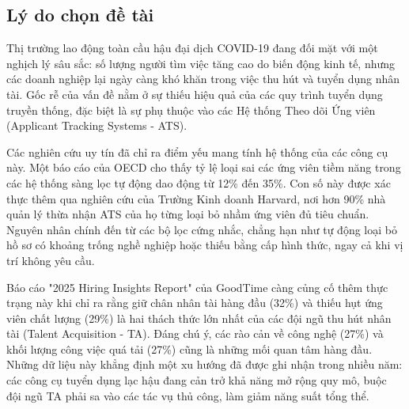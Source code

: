 \documentclass{article}
\begin{document}
\setcounter{subsection}{0}
\setcounter{table}{0}
\setcounter{figure}{0}
\subsection{Lý do chọn đề tài}

Thị trường lao động toàn cầu hậu đại dịch COVID-19 đang đối mặt với một nghịch lý sâu sắc: số lượng người tìm việc tăng cao do biến động kinh tế, nhưng các doanh nghiệp lại ngày càng khó khăn trong việc thu hút và tuyển dụng nhân tài. Gốc rễ của vấn đề nằm ở sự thiếu hiệu quả của các quy trình tuyển dụng truyền thống, đặc biệt là sự phụ thuộc vào các Hệ thống Theo dõi Ứng viên (Applicant Tracking Systems - ATS).

Các nghiên cứu uy tín đã chỉ ra điểm yếu mang tính hệ thống của các công cụ này. Một báo cáo của OECD cho thấy tỷ lệ loại sai các ứng viên tiềm năng trong các hệ thống sàng lọc tự động dao động từ 12\% đến 35\%. Con số này được xác thực thêm qua nghiên cứu của Trường Kinh doanh Harvard, nơi hơn 90\% nhà quản lý thừa nhận ATS của họ từng loại bỏ nhầm ứng viên đủ tiêu chuẩn. Nguyên nhân chính đến từ các bộ lọc cứng nhắc, chẳng hạn như tự động loại bỏ hồ sơ có khoảng trống nghề nghiệp hoặc thiếu bằng cấp hình thức, ngay cả khi vị trí không yêu cầu.

Báo cáo "2025 Hiring Insights Report" của GoodTime càng củng cố thêm thực trạng này khi chỉ ra rằng giữ chân nhân tài hàng đầu (32\%) và thiếu hụt ứng viên chất lượng (29\%) là hai thách thức lớn nhất của các đội ngũ thu hút nhân tài (Talent Acquisition - TA). Đáng chú ý, các rào cản về công nghệ (27\%) và khối lượng công việc quá tải (27\%) cũng là những mối quan tâm hàng đầu. Những dữ liệu này khẳng định một xu hướng đã được ghi nhận trong nhiều năm: các công cụ tuyển dụng lạc hậu đang cản trở khả năng mở rộng quy mô, buộc đội ngũ TA phải sa vào các tác vụ thủ công, làm giảm năng suất tổng thể.
\end{document}

